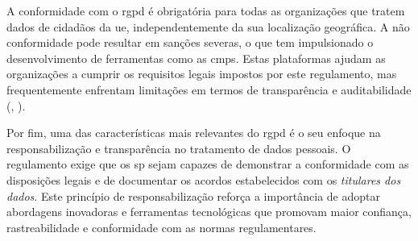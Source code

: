 A conformidade com o \acrshort{rgpd} é obrigatória para todas as organizações que tratem dados de cidadãos da \acrshort{ue}, independentemente da sua localização geográfica. A não conformidade pode resultar em sanções severas, o que tem impulsionado o desenvolvimento de ferramentas como as \acrshort{cmp}s. Estas plataformas ajudam as organizações a cumprir os requisitos legais impostos por este regulamento, mas frequentemente enfrentam limitações em termos de transparência e auditabilidade (\cite{ribeiro2025assessing}, \cite{ramos2019privacy}).

Por fim, uma das características mais relevantes do \acrshort{rgpd} é o seu enfoque na responsabilização e transparência no tratamento de dados pessoais. O regulamento exige que os \acrfull{sp} sejam capazes de demonstrar a conformidade com as disposições legais e de documentar os acordos estabelecidos com os \textit{titulares dos dados}. Este princípio de responsabilização reforça a importância de adoptar abordagens inovadoras e ferramentas tecnológicas que promovam maior confiança, rastreabilidade e conformidade com as normas regulamentares.




